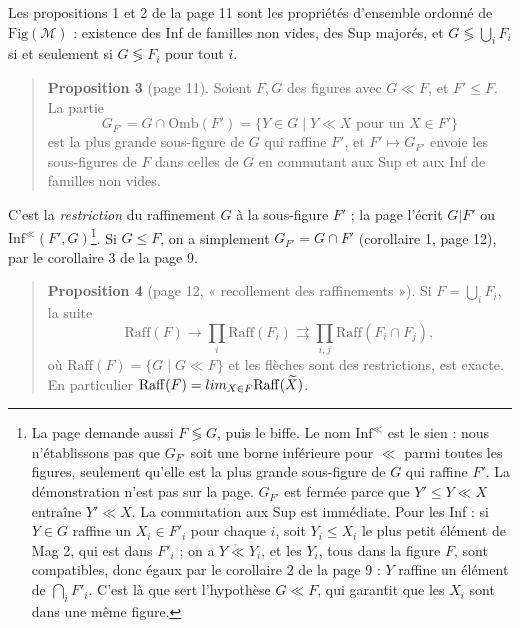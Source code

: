 \documentclass[11pt,a4paper]{article}
\begin{document}
Les propositions 1 et 2 de la page 11 sont les propriétés d'ensemble ordonné de
$\mathrm{Fig}(\mathcal{M})$ : existence des Inf de familles non vides, des Sup
majorés, et $G \lessgtr \bigcup_{i} F_{i}$ si et seulement si $G \lessgtr F_{i}$
pour tout $i$.

\begin{quote}
\textbf{Proposition 3} (page 11). Soient $F, G$ des figures avec $G \ll F$, et
$F' \leq F$. La partie
\[
G_{F'} = G \cap \mathrm{Omb}(F') = \{Y \in G \mid Y \ll X \text{ pour un } X
\in F'\}
\]
est la plus grande sous-figure de $G$ qui raffine $F'$, et $F' \mapsto G_{F'}$
envoie les sous-figures de $F$ dans celles de $G$ en commutant aux Sup et aux
Inf de familles non vides.
\end{quote}

C'est la \emph{restriction} du raffinement $G$ à la sous-figure $F'$ ; la page
l'écrit $G | F'$ ou $\mathrm{Inf}^{\ll}(F', G)$\footnote{La page demande
aussi $F \lessgtr G$, puis le biffe. Le nom $\mathrm{Inf}^{\ll}$ est le sien :
nous n'établissons pas que $G_{F'}$ soit une borne inférieure pour $\ll$ parmi
toutes les figures, seulement qu'elle est la plus grande sous-figure de $G$ qui
raffine $F'$. La démonstration n'est pas sur la page. $G_{F'}$ est fermée parce
que $Y' \leq Y \ll X$ entraîne $Y' \ll X$. La commutation aux Sup est
immédiate. Pour les Inf : si $Y \in G$ raffine un $X_{i} \in F'_{i}$ pour
chaque $i$, soit $Y_{i} \leq X_{i}$ le plus petit élément de Mag 2, qui est
dans $F'_{i}$ ; on a $Y \mathrel{\mathring{\ll}} Y_{i}$, et les $Y_{i}$, tous
dans la figure $F$, sont compatibles, donc égaux par le corollaire 2 de la page
9 : $Y$ raffine un élément de $\bigcap_{i} F'_{i}$. C'est là que sert
l'hypothèse $G \ll F$, qui garantit que les $X_{i}$ sont dans une même
figure.}. Si $G \leq F$, on a simplement $G_{F'} = G \cap F'$ (corollaire 1,
page 12), par le corollaire 3 de la page 9.

\begin{quote}
\textbf{Proposition 4} (page 12, « recollement des raffinements »). Si $F =
\bigcup_{i} F_{i}$, la suite
\[
\mathrm{Raff}(F) \longrightarrow \prod_{i} \mathrm{Raff}(F_{i})
\rightrightarrows \prod_{i,j} \mathrm{Raff}(F_{i} \cap F_{j}),
\]
où $\mathrm{Raff}(F) = \{G \mid G \ll F\}$ et les flèches sont des
restrictions, est exacte. En particulier $\mathrm{Raff}(F) =
\varprojlim_{X \in F} \mathrm{Raff}(\widetilde{X})$.
\end{quote}
\end{document}
